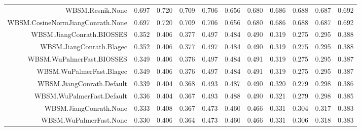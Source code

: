 \begin{table}[!h]
\begin{tabular}{rrrrrrrrrrr}
  WBSM.Resnik.None & 0.697 & 0.720 & 0.709 & 0.706 & 0.656 & 0.680 & 0.686 & 0.688 & 0.687 & 0.692 \\ 
  WBSM.CosineNormJiangConrath.None & 0.697 & 0.720 & 0.709 & 0.706 & 0.656 & 0.680 & 0.686 & 0.688 & 0.687 & 0.692 \\ 
  WBSM.JiangConrath.BIOSSES & 0.352 & 0.406 & 0.377 & 0.497 & 0.484 & 0.490 & 0.319 & 0.275 & 0.295 & 0.388 \\ 
  WBSM.JiangConrath.Blagec & 0.352 & 0.406 & 0.377 & 0.497 & 0.484 & 0.490 & 0.319 & 0.275 & 0.295 & 0.388 \\ 
  WBSM.WuPalmerFast.BIOSSES & 0.349 & 0.406 & 0.376 & 0.497 & 0.484 & 0.491 & 0.319 & 0.275 & 0.295 & 0.387 \\ 
  WBSM.WuPalmerFast.Blagec & 0.349 & 0.406 & 0.376 & 0.497 & 0.484 & 0.491 & 0.319 & 0.275 & 0.295 & 0.387 \\ 
  WBSM.JiangConrath.Default & 0.339 & 0.404 & 0.368 & 0.493 & 0.487 & 0.490 & 0.320 & 0.279 & 0.298 & 0.386 \\ 
  WBSM.WuPalmerFast.Default & 0.336 & 0.404 & 0.367 & 0.493 & 0.488 & 0.490 & 0.321 & 0.279 & 0.298 & 0.385 \\ 
  WBSM.JiangConrath.None & 0.333 & 0.408 & 0.367 & 0.473 & 0.460 & 0.466 & 0.331 & 0.304 & 0.317 & 0.383 \\ 
  WBSM.WuPalmerFast.None & 0.330 & 0.406 & 0.364 & 0.473 & 0.460 & 0.466 & 0.331 & 0.306 & 0.318 & 0.383 \\ 
   \hline
\end{tabular}
\endgroup
\end{table}
